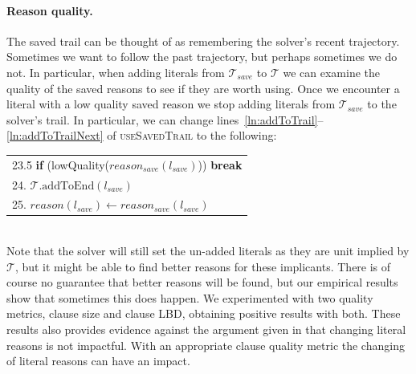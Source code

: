 \documentclass[runningheads]{llncs}
\newcommand{\trail}{\ensuremath{\mathcal{T}}}
\newcommand{\reason}[1]{\ensuremath{\mathit{reason}(#1)}}
\newcommand{\reasonsave}[1]{\ensuremath{\mathit{reason_{\mathit{save}}(#1)}}}
\newcommand{\litsave}{\ensuremath{\mathit{l_{\mathit{save}}}}}
\newcommand{\trailsave}{\trail_{\mathit{save}}}
\newcommand{\ust}{\textsc{useSavedTrail}\xspace}
\begin{document}
\paragraph{Reason quality.}
The saved trail can be thought of as remembering the solver's recent
trajectory. Sometimes we want to follow the past trajectory, but
perhaps sometimes we do not. In particular, when adding literals from
$\trailsave{}$ to $\trail$ we can examine the quality of the saved
reasons to see if they are worth using. Once we encounter a literal
with a low quality saved reason we stop adding literals from
$\trailsave$ to the solver's trail. In particular, we can change
lines~\ref{ln:addToTrail}--\ref{ln:addToTrailNext} of \ust
to the following:\\[5pt]
\begin{tabular}[t]{l}
23.5 \qquad \textbf{if} (lowQuality($\reasonsave{\litsave}$)) \textbf{break}\\
24.  \qquad $\trail.\mathrm{addToEnd(\litsave)}$\\
25.  \qquad $\reason{\litsave}\gets \reasonsave{\litsave}$
\end{tabular}\\[5pt]

Note that the solver will still set the un-added literals as they are
unit implied by $\trail$, but it might be able to find better reasons
for these implicants. There is of course no guarantee that better
reasons will be found, but our empirical results show that sometimes
this does happen. We experimented with two quality metrics, clause
size and clause LBD, obtaining positive results with both. These
results also provides evidence against the argument given in
\cite{DBLP:journals/jsat/TakRH11} that changing literal reasons is not
impactful. With an appropriate clause quality metric the changing of literal
reasons can have an impact.

\end{document}
